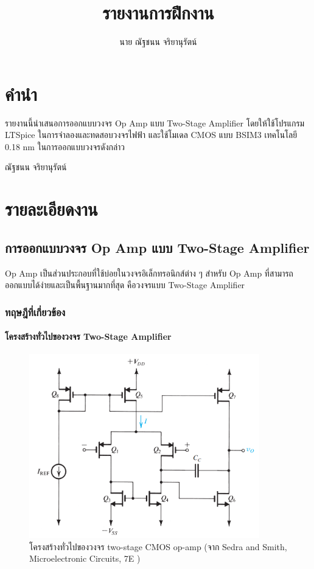 \documentclass[a4paper, 11pt, oneside]{book} %
\begin{document}
\title{รายงานการฝึกงาน}
\author{นาย ณัฐชนน จริยานุรัตน์}

\frontmatter %

\chapter*{คำนำ}

รายงานนี้นำเสนอการออกแบบวงจร Op Amp แบบ Two-Stage Amplifier โดยให้ใช้โปรแกรม LTSpice ในการจำลองและทดสอบวงจรไฟฟ้า และใช้โมเดล CMOS แบบ BSIM3 เทคโนโลยี 0.18 nm ในการออกแบบวงจรดังกล่าว

\begin{flushright} 
    ณัฐชนน จริยานุรัตน์
\end{flushright}

\tableofcontents

\mainmatter %

\chapter{รายละเอียดงาน}

\section{การออกแบบวงจร Op Amp แบบ Two-Stage Amplifier}

Op Amp เป็นส่วนประกอบที่ใช้บ่อยในวงจรอิเล็กทรอนิกส์ต่าง ๆ สำหรับ Op Amp ที่สามารถออกแบบได้ง่ายและเป็นพื้นฐานมากที่สุด คือวงจรแบบ Two-Stage Amplifier

\subsection{ทฤษฎีที่เกี่ยวข้อง}

\subsubsection{โครงสร้างทั่วไปของวงจร Two-Stage Amplifier}

\begin{figure}[h]
    \centering
    \includegraphics[width=10cm]{opamp-twostage}
    \caption{โครงสร้างทั่วไปของวงจร two-stage CMOS op-amp (จาก Sedra and Smith, Microelectronic Circuits, 7E \cite{Sedra15})}
    \label{opamp-twostage}
\end{figure}
\end{document}
